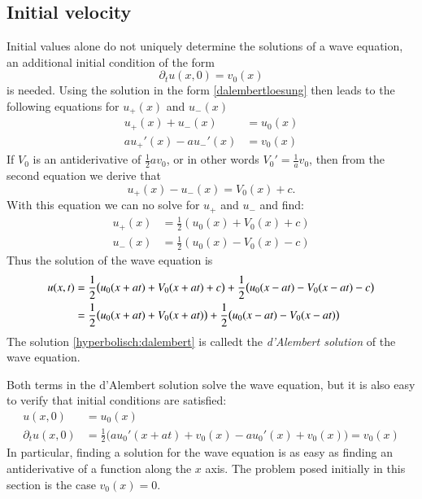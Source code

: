 \subsection{Initial velocity}
Initial values alone do not uniquely determine the solutions of a wave
equation, an additional initial condition of the form
\begin{equation}
\partial_tu(x,0)=v_0(x)\label{welleanfangdt}
\end{equation}
is needed.
Using the solution in the form \eqref{dalembertloesung} then leads
to the following equations for $u_+(x)$ and $u_-(x)$
\begin{align*}
u_+(x)+u_-(x)&=u_0(x)\\
au_+'(x)-au_-'(x)&=v_0(x)
\end{align*}
If $V_0$ is an antiderivative of $\frac12av_0$, or in other
words $V_0'=\frac1av_0$, then from the second equation we derive that
\[
u_+(x)-u_-(x)=V_0(x)+c.
\]
With this equation we can no solve for $u_+$ and $u_-$ and find:
\begin{align*}
u_+(x)&=\frac12(u_0(x)+V_0(x)+c)\\
u_-(x)&=\frac12(u_0(x)-V_0(x)-c)
\end{align*}
Thus the solution of the wave equation is
\begin{align}
u(x,t)
&=
\frac12\bigl(u_0(x+at)+V_0(x+at)+c\bigr)+\frac12\bigl(u_0(x-at)-V_0(x-at)-c\bigr)
\notag
\\
&=
\frac12\bigl(u_0(x+at)+V_0(x+at)\bigr)+\frac12\bigl(u_0(x-at)-V_0(x-at)\bigr)
\label{hyperbolisch:dalembert}
\end{align}
The solution \eqref{hyperbolisch:dalembert} is calledt the
{\em d'Alembert solution} of the wave equation.

Both terms in the d'Alembert solution solve the wave equation, but it
is also easy to verify that initial conditions are satisfied:
\begin{align*}
u(x,0)&=u_0(x)\\
\partial_tu(x,0)&=\frac12\bigl(au_0'(x+at)+v_0(x)-au_0'(x)+v_0(x)\bigr) =v_0(x)
\end{align*}
In particular, finding a solution for the wave equation is as easy as
finding an antiderivative of a function along the $x$ axis.
The problem posed initially in this section is the case
$v_0(x)=0$.


